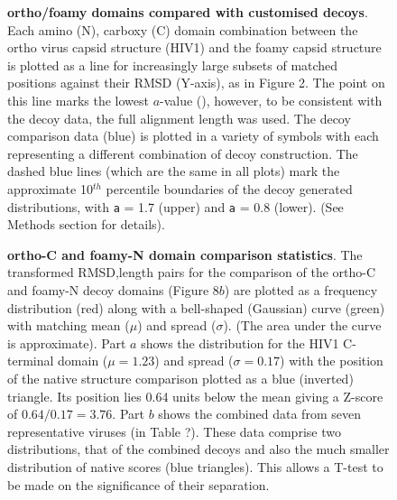 \begin{figure}
\centering
{}
\begin{footnotesize}
\caption{
\label{Fig:sapit}
{\bf ortho/foamy domains compared with customised decoys}.
Each amino (N), carboxy (C) domain combination between the ortho virus capsid structure (HIV1)
and the foamy capsid structure is plotted as a line for increasingly large subsets of matched
positions against their RMSD (Y-axis), as in Figure 2.  The point on this line marks the lowest
$a$-value (), however, to be consistent with the decoy data, the full alignment length
was used.  The decoy comparison data (blue) is plotted in a variety of symbols
with each representing a different combination of decoy construction.  The dashed blue lines
(which are the same in all plots) mark the approximate 10$^{th}$ percentile boundaries of
the decoy generated distributions,  with {\tt a} = 1.7 (upper) and  {\tt a} = 0.8 (lower). 
(See Methods section for details).
}
\end{footnotesize}
\end{figure}

\begin{figure}
\centering
{}
\begin{footnotesize}
\caption{
\label{Fig:norms}
{\bf ortho-C and foamy-N domain comparison statistics}.
The transformed RMSD,length pairs for the comparison of the ortho-C and foamy-N decoy domains
(Figure 8$b$) are plotted as a frequency distribution (red) along with a bell-shaped (Gaussian)
curve (green) with matching mean ($\mu$) and spread ($\sigma$). (The area under the curve is approximate).
Part $a$ shows the distribution for the HIV1 C-terminal domain ($\mu = 1.23$) and spread ($\sigma = 0.17$)
with the position of the native structure comparison plotted as a blue (inverted) triangle.  
Its position lies 0.64 units below the mean giving a Z-score of $0.64/0.17 = 3.76$.
Part $b$ shows the combined data from seven representative viruses (in Table ?).
These data comprise two distributions, that of the combined decoys and also the much smaller
distribution of native scores (blue triangles).   This allows a T-test to be made on the
significance of their separation.
}
\end{footnotesize}
\end{figure}

